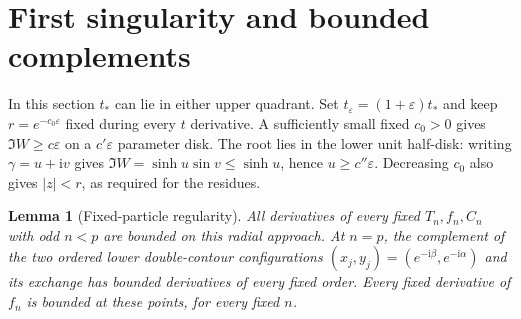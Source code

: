 \documentclass[11pt]{article}
\numberwithin{equation}{section}
\newtheorem{lemma}[theorem]{Lemma}
\theoremstyle{definition}
\newcommand{\ii}{\mathrm i}
\newcommand{\eps}{\varepsilon}
\begin{document}
\section{First singularity and bounded complements}\label{sec:first}
In this section $t_*$ can lie in either upper quadrant. Set
$t_\eps=(1+\eps)t_*$ and keep $r=e^{-c_0\eps}$ fixed during
every $t$ derivative. A sufficiently small fixed $c_0>0$ gives
$\Im W\ge c\eps$ on a $c'\eps$ parameter disk. The root lies
in the lower unit half-disk: writing $\gamma=u+\ii v$ gives
$\Im W=\sinh u\sin v\le\sinh u$, hence $u\ge c''\eps$.
Decreasing $c_0$ also gives $|z|<r$, as required for the residues.

\begin{lemma}[Fixed-particle regularity]\label{lem:complement}
All derivatives of every fixed $T_n,f_n,C_n$ with odd $n<p$
are bounded on this radial approach. At $n=p$, the complement
of the two ordered lower double-contour configurations
$(x_j,y_j)=(e^{-\ii\beta},e^{-\ii\alpha})$ and its exchange
has bounded derivatives of every fixed order. Every fixed
derivative of $f_n$ is bounded at these points, for every fixed $n$.
\end{lemma}
\end{document}
